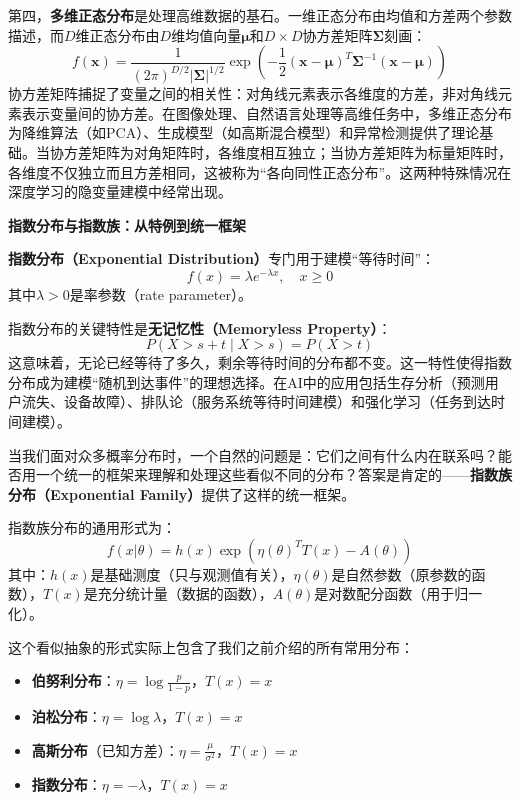 第四，\textbf{多维正态分布}是处理高维数据的基石。一维正态分布由均值和方差两个参数描述，而$D$维正态分布由$D$维均值向量$\boldsymbol{\mu}$和$D\times D$协方差矩阵$\boldsymbol{\Sigma}$刻画：
\begin{equation}
f(\mathbf{x}) = \frac{1}{(2\pi)^{D/2}|\boldsymbol{\Sigma}|^{1/2}}\exp\left(-\frac{1}{2}(\mathbf{x}-\boldsymbol{\mu})^T\boldsymbol{\Sigma}^{-1}(\mathbf{x}-\boldsymbol{\mu})\right)
\end{equation}
协方差矩阵捕捉了变量之间的相关性：对角线元素表示各维度的方差，非对角线元素表示变量间的协方差。在图像处理、自然语言处理等高维任务中，多维正态分布为降维算法（如PCA）、生成模型（如高斯混合模型）和异常检测提供了理论基础。当协方差矩阵为对角矩阵时，各维度相互独立；当协方差矩阵为标量矩阵时，各维度不仅独立而且方差相同，这被称为``各向同性正态分布''。这两种特殊情况在深度学习的隐变量建模中经常出现。

\textbf{指数分布与指数族：从特例到统一框架}

\textbf{指数分布（Exponential Distribution）}专门用于建模``等待时间''：
\begin{equation}
f(x) = \lambda e^{-\lambda x}, \quad x \geq 0
\end{equation}
其中$\lambda > 0$是率参数（rate parameter）。

指数分布的关键特性是\textbf{无记忆性（Memoryless Property）}：
\begin{equation}
P(X > s+t \mid X > s) = P(X > t)
\end{equation}
这意味着，无论已经等待了多久，剩余等待时间的分布都不变。这一特性使得指数分布成为建模``随机到达事件''的理想选择。在AI中的应用包括生存分析（预测用户流失、设备故障）、排队论（服务系统等待时间建模）和强化学习（任务到达时间建模）。

当我们面对众多概率分布时，一个自然的问题是：它们之间有什么内在联系吗？能否用一个统一的框架来理解和处理这些看似不同的分布？答案是肯定的——\textbf{指数族分布（Exponential Family）}提供了这样的统一框架。

指数族分布的通用形式为：
\begin{equation}
f(x|\theta) = h(x)\exp\left(\eta(\theta)^T T(x) - A(\theta)\right)
\end{equation}
其中：$h(x)$是基础测度（只与观测值有关），$\eta(\theta)$是自然参数（原参数的函数），$T(x)$是充分统计量（数据的函数），$A(\theta)$是对数配分函数（用于归一化）。

这个看似抽象的形式实际上包含了我们之前介绍的所有常用分布：
\begin{itemize}
  \item \textbf{伯努利分布}：$\eta = \log\frac{p}{1-p}$，$T(x) = x$
  \item \textbf{泊松分布}：$\eta = \log\lambda$，$T(x) = x$
  \item \textbf{高斯分布}（已知方差）：$\eta = \frac{\mu}{\sigma^2}$，$T(x) = x$
  \item \textbf{指数分布}：$\eta = -\lambda$，$T(x) = x$
\end{itemize}

